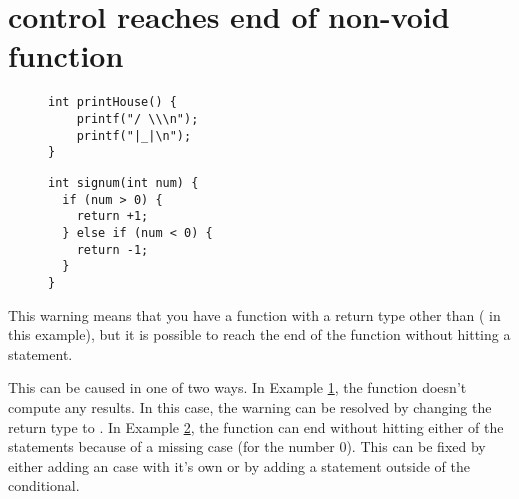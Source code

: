 \section{control reaches end of non-void function}\label{sec:missing-return}

\begin{figure}
\begin{lstlisting}
int printHouse() {
	printf("/ \\\n");
	printf("|_|\n");
}
\end{lstlisting}
\label{ex:func-not-void}
\end{figure}

\begin{figure}
\begin{lstlisting}
int signum(int num) {
  if (num > 0) {
    return +1;
  } else if (num < 0) {
    return -1;
  }
}
\end{lstlisting}
\label{ex:missing-return}
\end{figure}

This warning means that you have a function with a return type other than  ( in this example), but it is possible to reach the end of the function without hitting a  statement.

This can be caused in one of two ways.
In Example \ref{ex:func-not-void}, the  function doesn't compute any results.
In this case, the warning can be resolved by changing the return type to .
In Example \ref{ex:missing-return}, the  function can end without hitting either of the  statements because of a missing  case (for the number 0).
This can be fixed by either adding an  case with it's own  or by adding a  statement outside of the conditional.

\newpage